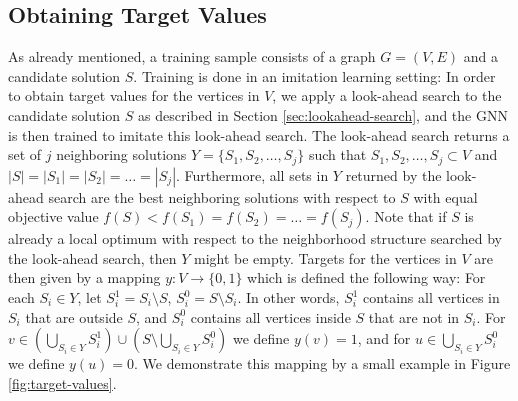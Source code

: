 \documentclass[draft,final]{vutinfth} %
\begin{document}
\subsection{Obtaining Target Values}\label{subsec:target-values}
As already mentioned, a training sample consists of a graph $G = (V,E)$ and a candidate solution $S$. Training is done in an imitation learning setting: In order to obtain target values for the vertices in $V$, we apply a look-ahead search to the candidate solution $S$ as described in Section \ref{sec:lookahead-search}, and the GNN is then trained to imitate this look-ahead search. 
The look-ahead search returns a set of $j$ neighboring solutions $Y = \{S_1, S_2, \dots, S_j\}$ such that $S_1, S_2, \dots, S_j \subset V$ and $|S| = |S_1| = |S_2| = \dots = |S_j|$. Furthermore, all sets in $Y$ returned by the look-ahead search are the best neighboring solutions with respect to $S$ with equal objective value $f(S) < f(S_1) = f(S_2) = \dots = f(S_j)$. Note that if $S$ is already a local optimum with respect to the neighborhood structure searched by the look-ahead search, then $Y$ might be empty. Targets for the vertices in $V$ are then given by a mapping $y \colon V \rightarrow \{0,1\}$ which is defined the following way: For each $S_i \in Y$, let $S_{i}^1 = S_i \setminus S$, $S_{i}^0 = S \setminus S_i$. In other words, $S_i^1$ contains all vertices in $S_i$ that are outside $S$, and $S_i^0$ contains all vertices inside $S$ that are not in $S_i$. For $v \in (\bigcup_{S_i \in Y} S_i^1) \cup (S \setminus \bigcup_{S_i \in Y} S_i^0)$ we define $y(v) = 1$, and for $u \in \bigcup_{S_i \in Y} S_i^0$ we define $y(u) = 0 $. We demonstrate this mapping by a small example in Figure \ref{fig:target-values}. 

\end{document}
